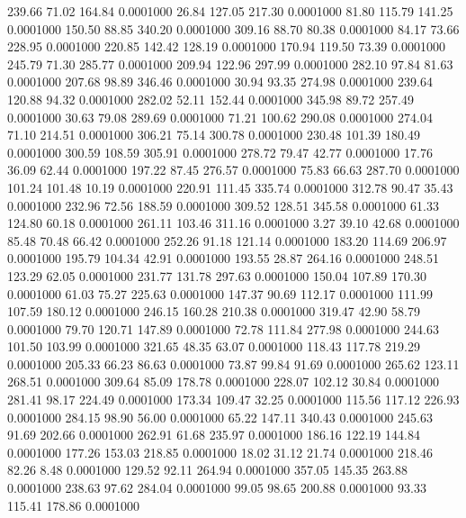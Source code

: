  239.66   71.02  164.84   0.0001000
  26.84  127.05  217.30   0.0001000
  81.80  115.79  141.25   0.0001000
 150.50   88.85  340.20   0.0001000
 309.16   88.70   80.38   0.0001000
  84.17   73.66  228.95   0.0001000
 220.85  142.42  128.19   0.0001000
 170.94  119.50   73.39   0.0001000
 245.79   71.30  285.77   0.0001000
 209.94  122.96  297.99   0.0001000
 282.10   97.84   81.63   0.0001000
 207.68   98.89  346.46   0.0001000
  30.94   93.35  274.98   0.0001000
 239.64  120.88   94.32   0.0001000
 282.02   52.11  152.44   0.0001000
 345.98   89.72  257.49   0.0001000
  30.63   79.08  289.69   0.0001000
  71.21  100.62  290.08   0.0001000
 274.04   71.10  214.51   0.0001000
 306.21   75.14  300.78   0.0001000
 230.48  101.39  180.49   0.0001000
 300.59  108.59  305.91   0.0001000
 278.72   79.47   42.77   0.0001000
  17.76   36.09   62.44   0.0001000
 197.22   87.45  276.57   0.0001000
  75.83   66.63  287.70   0.0001000
 101.24  101.48   10.19   0.0001000
 220.91  111.45  335.74   0.0001000
 312.78   90.47   35.43   0.0001000
 232.96   72.56  188.59   0.0001000
 309.52  128.51  345.58   0.0001000
  61.33  124.80   60.18   0.0001000
 261.11  103.46  311.16   0.0001000
   3.27   39.10   42.68   0.0001000
  85.48   70.48   66.42   0.0001000
 252.26   91.18  121.14   0.0001000
 183.20  114.69  206.97   0.0001000
 195.79  104.34   42.91   0.0001000
 193.55   28.87  264.16   0.0001000
 248.51  123.29   62.05   0.0001000
 231.77  131.78  297.63   0.0001000
 150.04  107.89  170.30   0.0001000
  61.03   75.27  225.63   0.0001000
 147.37   90.69  112.17   0.0001000
 111.99  107.59  180.12   0.0001000
 246.15  160.28  210.38   0.0001000
 319.47   42.90   58.79   0.0001000
  79.70  120.71  147.89   0.0001000
  72.78  111.84  277.98   0.0001000
 244.63  101.50  103.99   0.0001000
 321.65   48.35   63.07   0.0001000
 118.43  117.78  219.29   0.0001000
 205.33   66.23   86.63   0.0001000
  73.87   99.84   91.69   0.0001000
 265.62  123.11  268.51   0.0001000
 309.64   85.09  178.78   0.0001000
 228.07  102.12   30.84   0.0001000
 281.41   98.17  224.49   0.0001000
 173.34  109.47   32.25   0.0001000
 115.56  117.12  226.93   0.0001000
 284.15   98.90   56.00   0.0001000
  65.22  147.11  340.43   0.0001000
 245.63   91.69  202.66   0.0001000
 262.91   61.68  235.97   0.0001000
 186.16  122.19  144.84   0.0001000
 177.26  153.03  218.85   0.0001000
  18.02   31.12   21.74   0.0001000
 218.46   82.26    8.48   0.0001000
 129.52   92.11  264.94   0.0001000
 357.05  145.35  263.88   0.0001000
 238.63   97.62  284.04   0.0001000
  99.05   98.65  200.88   0.0001000
  93.33  115.41  178.86   0.0001000
